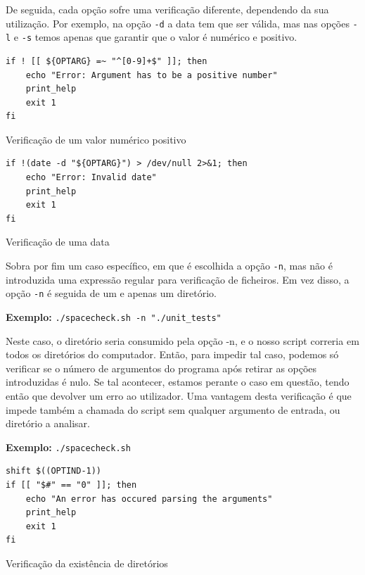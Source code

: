 De seguida, cada opção sofre uma verificação diferente,
dependendo da sua utilização. Por exemplo, na opção \verb|-d| a
data tem que ser válida, mas nas opções \verb|-l| e \verb|-s|
temos apenas que garantir que o valor é numérico e positivo.
\begin{listing}[H]
\begin{verbatim}
if ! [[ ${OPTARG} =~ "^[0-9]+$" ]]; then
    echo "Error: Argument has to be a positive number"
    print_help
    exit 1
fi
\end{verbatim}
\caption{Verificação de um valor numérico positivo}
\end{listing}

\begin{listing}[H]
\begin{verbatim}
if !(date -d "${OPTARG}") > /dev/null 2>&1; then
    echo "Error: Invalid date"
    print_help
    exit 1
fi
\end{verbatim}
\caption{Verificação de uma data}
\end{listing}

Sobra por fim um caso específico, em que é escolhida a opção
\verb|-n|, mas não é introduzida uma expressão regular para
verificação de ficheiros. Em vez disso, a opção \verb|-n| é
seguida de um e apenas um diretório.
\begin{listing}[H]
    \centering
    \textbf{Exemplo:} \verb|./spacecheck.sh -n "./unit_tests"|
\end{listing}
Neste caso, o diretório seria consumido pela opção -n, e o
nosso script correria em todos os diretórios do computador. 
Então, para impedir tal caso, podemos só verificar se o número
de argumentos do programa após retirar as opções introduzidas é
nulo. Se tal acontecer, estamos perante o caso em questão,
tendo então que devolver um erro ao utilizador. 
Uma vantagem desta verificação é que impede também a chamada do
script sem qualquer argumento de entrada, ou diretório a analisar.
\begin{listing}[H]
    \centering
    \textbf{Exemplo:} \verb|./spacecheck.sh|
\end{listing}
\begin{listing}[H]
\begin{verbatim}
shift $((OPTIND-1))
if [[ "$#" == "0" ]]; then
    echo "An error has occured parsing the arguments"
    print_help
    exit 1
fi
\end{verbatim}
\caption{Verificação da existência de diretórios}
\end{listing}


